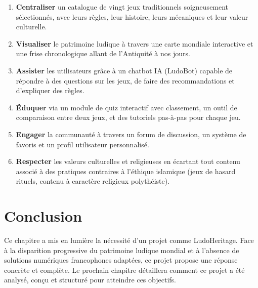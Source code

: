 \begin{enumerate}
    \item \textbf{Centraliser} un catalogue de vingt jeux traditionnels soigneusement sélectionnés,
          avec leurs règles, leur histoire, leurs mécaniques et leur valeur culturelle.

    \item \textbf{Visualiser} le patrimoine ludique à travers une carte mondiale interactive et
          une frise chronologique allant de l'Antiquité à nos jours.

    \item \textbf{Assister} les utilisateurs grâce à un chatbot IA (LudoBot) capable de répondre
          à des questions sur les jeux, de faire des recommandations et d'expliquer des règles.

    \item \textbf{Éduquer} via un module de quiz interactif avec classement, un outil de
          comparaison entre deux jeux, et des tutoriels pas-à-pas pour chaque jeu.

    \item \textbf{Engager} la communauté à travers un forum de discussion, un système de favoris
          et un profil utilisateur personnalisé.

    \item \textbf{Respecter} les valeurs culturelles et religieuses en écartant tout contenu
          associé à des pratiques contraires à l'éthique islamique (jeux de hasard rituels,
          contenu à caractère religieux polythéiste).
\end{enumerate}

\section{Conclusion}

Ce chapitre a mis en lumière la nécessité d'un projet comme LudoHeritage. Face à la disparition
progressive du patrimoine ludique mondial et à l'absence de solutions numériques francophones
adaptées, ce projet propose une réponse concrète et complète. Le prochain chapitre détaillera
comment ce projet a été analysé, conçu et structuré pour atteindre ces objectifs.
